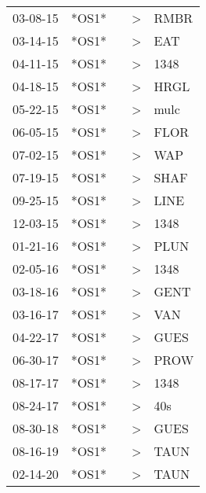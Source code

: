 \begin{supertabular}{lllll}
 03-08-15 &  *OS1* &   &  \textgreater &  RMBR \\
 03-14-15 &  *OS1* &   &  \textgreater &   EAT \\
 04-11-15 &  *OS1* &   &  \textgreater &  1348 \\
 04-18-15 &  *OS1* &   &  \textgreater &  HRGL \\
 05-22-15 &  *OS1* &   &  \textgreater &  mulc \\
 06-05-15 &  *OS1* &   &  \textgreater &  FLOR \\
 07-02-15 &  *OS1* &   &  \textgreater &   WAP \\
 07-19-15 &  *OS1* &   &  \textgreater &  SHAF \\
 09-25-15 &  *OS1* &   &  \textgreater &  LINE \\
 12-03-15 &  *OS1* &   &  \textgreater &  1348 \\
 01-21-16 &  *OS1* &   &  \textgreater &  PLUN \\
 02-05-16 &  *OS1* &   &  \textgreater &  1348 \\
 03-18-16 &  *OS1* &   &  \textgreater &  GENT \\
 03-16-17 &  *OS1* &   &  \textgreater &   VAN \\
 04-22-17 &  *OS1* &   &  \textgreater &  GUES \\
 06-30-17 &  *OS1* &   &  \textgreater &  PROW \\
 08-17-17 &  *OS1* &   &  \textgreater &  1348 \\
 08-24-17 &  *OS1* &   &  \textgreater &   40s \\
 08-30-18 &  *OS1* &   &  \textgreater &  GUES \\
 08-16-19 &  *OS1* &   &  \textgreater &  TAUN \\
 02-14-20 &  *OS1* &   &  \textgreater &  TAUN \\
\end{supertabular}
